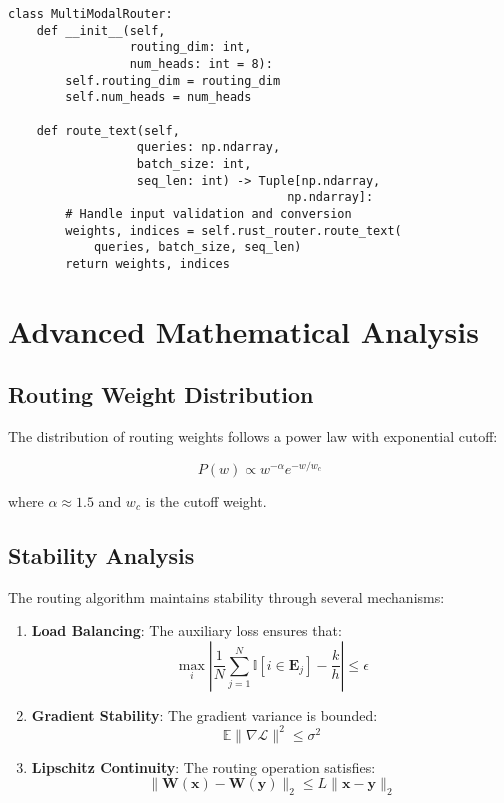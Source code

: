 \documentclass[10pt]{article}
\begin{document}
\begin{verbatim}
class MultiModalRouter:
    def __init__(self, 
                 routing_dim: int, 
                 num_heads: int = 8):
        self.routing_dim = routing_dim
        self.num_heads = num_heads
        
    def route_text(self, 
                  queries: np.ndarray, 
                  batch_size: int, 
                  seq_len: int) -> Tuple[np.ndarray, 
                                       np.ndarray]:
        # Handle input validation and conversion
        weights, indices = self.rust_router.route_text(
            queries, batch_size, seq_len)
        return weights, indices
\end{verbatim}

\section{Advanced Mathematical Analysis}

\subsection{Routing Weight Distribution}
The distribution of routing weights follows a power law with exponential cutoff:

\begin{equation}
    P(w) \propto w^{-\alpha} e^{-w/w_c}
\end{equation}

where $\alpha \approx 1.5$ and $w_c$ is the cutoff weight.

\subsection{Stability Analysis}
The routing algorithm maintains stability through several mechanisms:

\begin{enumerate}
    \item \textbf{Load Balancing}: The auxiliary loss ensures that:
    \begin{equation}
        \max_i \left|\frac{1}{N}\sum_{j=1}^N \mathbb{I}[i \in \mathbf{E}_j] - \frac{k}{h}\right| \leq \epsilon
    \end{equation}
    
    \item \textbf{Gradient Stability}: The gradient variance is bounded:
    \begin{equation}
        \mathbb{E}\|\nabla \mathcal{L}\|^2 \leq \sigma^2
    \end{equation}
    
    \item \textbf{Lipschitz Continuity}: The routing operation satisfies:
    \begin{equation}
        \|\mathbf{W}(\mathbf{x}) - \mathbf{W}(\mathbf{y})\|_2 \leq L\|\mathbf{x} - \mathbf{y}\|_2
    \end{equation}
\end{enumerate}
\end{document}
